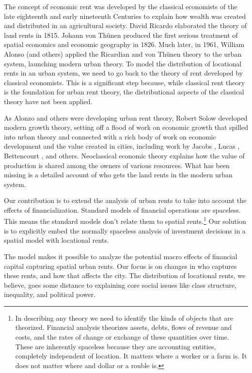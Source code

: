 The concept of economic rent was developed by the classical economists of the late eighteenth and early nineteenth Centuries to explain how wealth was created and distributed in an agricultural society. David Ricardo \cite{ricardoEssayInfluenceLow1815} elaborated the theory of land rents in 1815. Johann von Th\"unen \cite{vonthunenIsolirteStaatBeziehung1826} produced the first serious treatment of spatial economics and economic geography in 1826. Much later, in 1961, William Alonso (and others) \cite{alonsoModelUrbanLand1960} applied the Ricardian and von Th\"unen theory to the urban system, launching modern urban theory. To model the distribution of locational rents in an urban system, we need to go back to the theory of rent developed by classical economists. This is a significant step because, while classical rent theory is the foundation for urban rent theory, the distributional aspects of the classical theory have not been applied.

As Alonzo and others were developing urban rent theory, Robert Solow \cite{solowContributionTheoryEconomic1956} developed modern growth theory, setting off a flood of work on economic growth that spilled into urban theory and connected with a rich body of work on economic development and the value created in cities, including work by Jacobs \cite{jacobsEconomyCities1969}, Lucas \cite{lucasMechanicsEconomicDevelopment1988}, Bettencourt \cite{bettencourtGrowthInnovationScaling2007}, and others. 
Neoclassical economic theory explains how the value of production is shared among the owners of various resources.  What has been missing is a detailed account of who gets the land rents in the modern urban system. 

Our contribution is to extend the analysis of urban rents to take into account the effects of financialization. Standard models of financial operations are spaceless. This means the standard models don't relate them to spatial rents.\footnote{In describing any theory we need to identify the kinds of objects that are theorized. Financial analysis theorizes assets, debts, flows of revenue and costs, and the rates of change or exchange of these quantities over time. These are inherently spaceless because they are accounting entities, completely independent of location. It matters where a worker or a farm is. It does not matter where and dollar or a rouble is.} Our solution is to explicitly embed the normally spaceless analysis of investment decisions in a spatial model with locational rents.

The model makes it possible to analyze the potential macro effects of financial capital capturing spatial urban rents. Our focus is on changes in who captures these rents, and how that affects the city. The distribution of locational rents, we believe, goes some distance to explaining core social issues like class structure, inequality, and political power.

